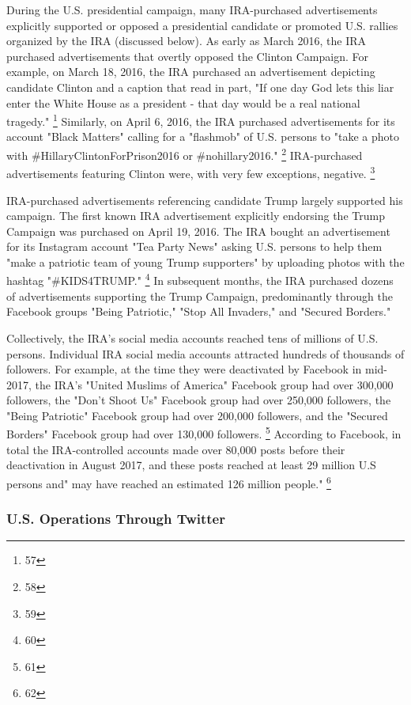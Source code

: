 During the U.S. presidential campaign, many IRA-purchased advertisements explicitly supported or opposed a  presidential candidate or promoted U.S. rallies organized by the IRA (discussed below).
As early as March 2016, the IRA purchased advertisements that overtly opposed the Clinton Campaign.
For example, on March 18, 2016, the IRA purchased an advertisement depicting candidate Clinton and a caption that read in part, "If one day God lets this liar enter the White House as a president - that day would be a  real national tragedy."%
\footnote{57}
Similarly, on April 6, 2016, the IRA purchased advertisements for its account "Black Matters" calling for a  "flashmob" of U.S. persons to "take a photo with \#HillaryClintonForPrison2016 or \#nohillary2016."%
\footnote{58}
IRA-purchased advertisements featuring Clinton were, with very few exceptions, negative.%
\footnote{59}

IRA-purchased advertisements referencing candidate Trump largely supported his campaign.
The first known IRA advertisement explicitly endorsing the Trump Campaign was purchased on April 19, 2016.
The IRA bought an advertisement for its Instagram account "Tea Party News" asking U.S. persons to help them "make a patriotic team of young Trump supporters" by uploading photos with the hashtag "\#KIDS4TRUMP."%
\footnote{60}
In subsequent months, the IRA purchased dozens of advertisements supporting the Trump Campaign, predominantly through the Facebook groups "Being Patriotic," "Stop All Invaders," and "Secured Borders."

Collectively, the IRA's social media accounts reached tens of millions of U.S. persons.
Individual IRA social media accounts attracted hundreds of thousands of followers.
For example, at the time they were deactivated by Facebook in mid-2017, the IRA's "United Muslims of America" Facebook group had over 300,000 followers, the "Don't Shoot Us" Facebook group had over 250,000 followers, the "Being Patriotic" Facebook group had over 200,000 followers, and the "Secured Borders" Facebook group had over 130,000 followers.%
\footnote{61}
According to Facebook, in total the IRA-controlled accounts made over 80,000 posts before their deactivation in August 2017, and these posts reached at least 29 million U.S persons and" may have reached an estimated 126 million people."%
\footnote{62}

\subsubsection{U.S. Operations Through Twitter}

